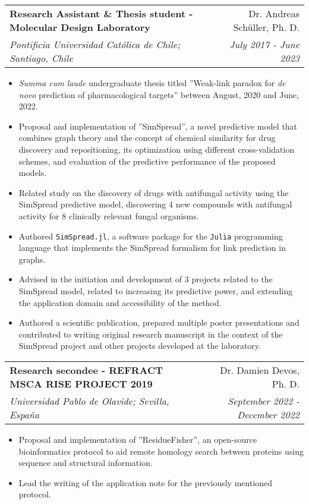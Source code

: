 \documentclass[letter,20pt]{article}
\makeatletter
\newcommand{\resumeSubheading}[4]{
  \vspace{-1pt}\item
    \begin{tabular*}{0.97\textwidth}{l@{\extracolsep{\fill}}r}
      \textbf{#1} & #2 \\
      \textit{#3} & \textit{#4} \\
    \end{tabular*}\vspace{-5pt}
}
\makeatother
\begin{document}
\resumeSubheading{Research Assistant \& Thesis student - Molecular Design Laboratory}{Dr. Andreas Schüller, Ph. D.}{Pontificia Universidad Católica de Chile; Santiago, Chile}{July 2017 - June 2023}
\vspace{2pt}
\small{
	\begin{itemize}
		\item \textit{Summa cum laude} undergraduate thesis titled ''Weak-link paradox for \textit{de novo} prediction of pharmacological targets'' between August, 2020 and June, 2022.
		\item Proposal and implementation of ''SimSpread'', a novel predictive model that combines graph theory and the concept of chemical similarity for drug discovery and repositioning, its optimization using different cross-validation schemes, and evaluation of the predictive performance of the proposed models.
		\item Related study on the discovery of drugs with antifungal activity using the SimSpread predictive model, discovering 4 new compounds with antifungal activity for 8 clinically relevant fungal organisms.
		\item Authored \texttt{SimSpread.jl}, a software package for the \texttt{Julia} programming language that implements the SimSpread formalism for link prediction in graphs.
		\item Advised in the initiation and development of 3 projects related to the SimSpread model, related to increasing its predictive power, and extending the application domain and accessibility of the method.
		\item Authored a scientific publication, prepared multiple poster presentations and contributed to writing original research manuscript in the context of the SimSpread project and other projects developed at the laboratory.
	\end{itemize}
}

\resumeSubheading{Research secondee - REFRACT MSCA RISE PROJECT 2019}{Dr. Damien Devos, Ph. D.}{Universidad Pablo de Olavide; Sevilla, España}{September 2022 - December 2022}
\vspace{2pt}
\begin{itemize}
	\item Proposal and implementation of ''ResidueFisher'', an open-source bioinformatics protocol to aid remote homology search between proteins using sequence and structural information.
	\item Lead the writing of the application note for the previously mentioned protocol.
\end{itemize}
\end{document}
